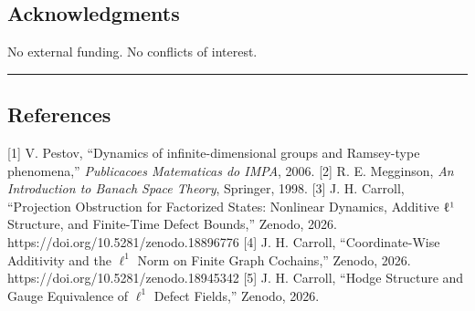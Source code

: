 \documentclass[
]{article}
\begin{document}
\subsection{Acknowledgments}\label{acknowledgments}

No external funding. No conflicts of interest.

\begin{center}\rule{0.5\linewidth}{0.5pt}\end{center}

\subsection{References}\label{references}

{[}1{]} V. Pestov, ``Dynamics of infinite-dimensional groups and
Ramsey-type phenomena,'' \emph{Publicacoes Matematicas do IMPA}, 2006.
{[}2{]} R. E. Megginson, \emph{An Introduction to Banach Space Theory},
Springer, 1998. {[}3{]} J. H. Carroll, ``Projection Obstruction for
Factorized States: Nonlinear Dynamics, Additive ℓ¹ Structure, and
Finite-Time Defect Bounds,'' Zenodo, 2026.
https://doi.org/10.5281/zenodo.18896776 {[}4{]} J. H. Carroll,
``Coordinate-Wise Additivity and the \(\ell^1\) Norm on Finite Graph
Cochains,'' Zenodo, 2026. https://doi.org/10.5281/zenodo.18945342
{[}5{]} J. H. Carroll, ``Hodge Structure and Gauge Equivalence of
\(\ell^1\) Defect Fields,'' Zenodo, 2026.
\end{document}
